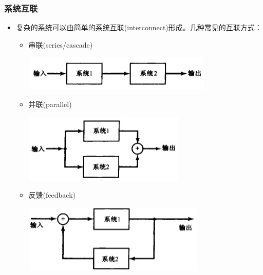 \documentclass[CJKutf8,dvipsnames,table]{beamer}
\begin{document}
\begin{CJK*}{UTF8}{song}
  \begin{frame}
    \frametitle{系统互联}
    \begin{itemize}
    \item 复杂的系统可以由简单的系统互联(interconnect)形成。几种常见的互联方式：
        \begin{itemize}
        \item 串联(series/cascade)
    \begin{center}
      \includegraphics[scale=.5]{ss-c-f1-42a}
    \end{center}           
        \item 并联(parallel)
    \begin{center}
      \includegraphics[scale=.5]{ss-c-f1-42b}
    \end{center}           
        \item 反馈(feedback)
    \begin{center}
      \includegraphics[scale=.5]{ss-c-f1-43}
    \end{center}           
        \end{itemize}    
    \end{itemize} 
  \end{frame}
      

\end{CJK*}
\end{document}

